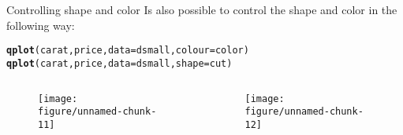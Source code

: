 \documentclass{beamer}\usepackage[]{graphicx}\usepackage[]{color}
\makeatletter
\def\maxwidth{ %
  \ifdim\Gin@nat@width>\linewidth
    \linewidth
  \else
    \Gin@nat@width
  \fi
}
\newcommand{\hlstd}[1]{\textcolor[rgb]{0.345,0.345,0.345}{#1}}%
\newcommand{\hlkwc}[1]{\textcolor[rgb]{0.333,0.667,0.333}{#1}}%
\newcommand{\hlkwd}[1]{\textcolor[rgb]{0.737,0.353,0.396}{\textbf{#1}}}%
\newenvironment{kframe}{%
 \def\at@end@of@kframe{}%
 \ifinner\ifhmode%
  \def\at@end@of@kframe{\end{minipage}}%
  \begin{minipage}{\columnwidth}%
 \fi\fi%
 \def\FrameCommand##1{\hskip\@totalleftmargin \hskip-\fboxsep
 \colorbox{shadecolor}{##1}\hskip-\fboxsep
     \hskip-\linewidth \hskip-\@totalleftmargin \hskip\columnwidth}%
 \MakeFramed {\advance\hsize-\width
   \@totalleftmargin\z@ \linewidth\hsize
   \@setminipage}}%
 {\par\unskip\endMakeFramed%
 \at@end@of@kframe}
\newenvironment{knitrout}{}{} %
\makeatother
\begin{document}
\begin{frame}[containsverbatim]{Controlling shape and color}
Is also possible to control the shape and color in the following way:
\begin{knitrout}\footnotesize
{}\color{fgcolor}\begin{kframe}
\begin{alltt}
\hlkwd{qplot}\hlstd{(carat, price,} \hlkwc{data} \hlstd{= dsmall,} \hlkwc{colour} \hlstd{= color)}
\hlkwd{qplot}\hlstd{(carat, price,} \hlkwc{data} \hlstd{= dsmall,} \hlkwc{shape} \hlstd{= cut)}
\end{alltt}
\end{kframe}
\end{knitrout}
\begin{columns}[t] 
\begin{framed}
 \begin{minipage}{1\textwidth}
\begin{figure}[!t]
\centering
\begin{knitrout}\footnotesize
{}\color{fgcolor}
\texttt{[image: figure/unnamed-chunk-11]} 

\end{knitrout}
\end{figure}
 \end{minipage}
 \end{framed}

\begin{framed}
 \begin{minipage}{1\textwidth}
\begin{figure}[!t]
\centering
\begin{knitrout}\footnotesize
{}\color{fgcolor}
\texttt{[image: figure/unnamed-chunk-12]} 

\end{knitrout}
\end{figure}
 \end{minipage}
 \end{framed}
\end{columns}
\end{frame}
\end{document}
